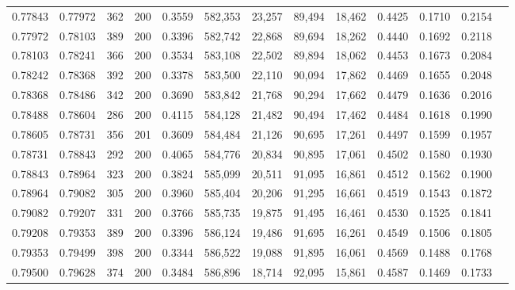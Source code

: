 \begin{tabular}{rrrrrrrrrrrrr}
0.77843 & 0.77972 &   362 & 200 &                                     0.3559 & 582,353 &  23,257 &  89,494 &  18,462 & 0.4425 & 0.1710 & 0.2154 \\
0.77972 & 0.78103 &   389 & 200 &                                     0.3396 & 582,742 &  22,868 &  89,694 &  18,262 & 0.4440 & 0.1692 & 0.2118 \\
0.78103 & 0.78241 &   366 & 200 &                                     0.3534 & 583,108 &  22,502 &  89,894 &  18,062 & 0.4453 & 0.1673 & 0.2084 \\
0.78242 & 0.78368 &   392 & 200 &                                     0.3378 & 583,500 &  22,110 &  90,094 &  17,862 & 0.4469 & 0.1655 & 0.2048 \\
0.78368 & 0.78486 &   342 & 200 &                                     0.3690 & 583,842 &  21,768 &  90,294 &  17,662 & 0.4479 & 0.1636 & 0.2016 \\
0.78488 & 0.78604 &   286 & 200 &                                     0.4115 & 584,128 &  21,482 &  90,494 &  17,462 & 0.4484 & 0.1618 & 0.1990 \\
0.78605 & 0.78731 &   356 & 201 &                                     0.3609 & 584,484 &  21,126 &  90,695 &  17,261 & 0.4497 & 0.1599 & 0.1957 \\
0.78731 & 0.78843 &   292 & 200 &                                     0.4065 & 584,776 &  20,834 &  90,895 &  17,061 & 0.4502 & 0.1580 & 0.1930 \\
0.78843 & 0.78964 &   323 & 200 &                                     0.3824 & 585,099 &  20,511 &  91,095 &  16,861 & 0.4512 & 0.1562 & 0.1900 \\
0.78964 & 0.79082 &   305 & 200 &                                     0.3960 & 585,404 &  20,206 &  91,295 &  16,661 & 0.4519 & 0.1543 & 0.1872 \\
0.79082 & 0.79207 &   331 & 200 &                                     0.3766 & 585,735 &  19,875 &  91,495 &  16,461 & 0.4530 & 0.1525 & 0.1841 \\
0.79208 & 0.79353 &   389 & 200 &                                     0.3396 & 586,124 &  19,486 &  91,695 &  16,261 & 0.4549 & 0.1506 & 0.1805 \\
0.79353 & 0.79499 &   398 & 200 &                                     0.3344 & 586,522 &  19,088 &  91,895 &  16,061 & 0.4569 & 0.1488 & 0.1768 \\
0.79500 & 0.79628 &   374 & 200 &                                     0.3484 & 586,896 &  18,714 &  92,095 &  15,861 & 0.4587 & 0.1469 & 0.1733 \\

\end{tabular}
